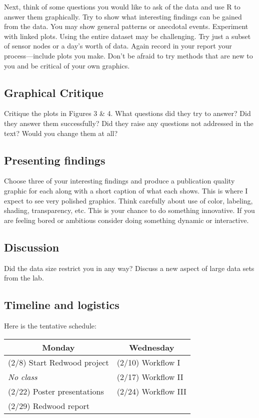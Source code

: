 \documentclass[11pt, oneside]{article}   	%
\begin{document}
Next, think of some questions you would like to ask of the data and use R to
answer them graphically. Try to show what interesting findings can be gained
from the data. You may show general patterns or anecdotal events. Experiment
with linked plots. Using the entire dataset may be challenging. Try just a
subset of sensor nodes or a day's worth of data. Again record in your report
your process---include plots you make. Don't be afraid to try methods that are
new to you and be critical of your own graphics.

\subsection*{Graphical Critique}

Critique the plots in Figures 3 \& 4. What questions did they try to answer?
Did they answer them successfully? Did they raise any questions not addressed
in the text? Would you change them at all?


\subsection*{Presenting findings}

Choose three of your interesting findings and produce a publication quality
graphic for each along with a short caption of what each shows. This is where I
expect to see very polished graphics. Think carefully about use of color,
labeling, shading, transparency, etc. This is your chance to do something
innovative. If you are feeling bored or ambitious consider doing something
dynamic or interactive.


\subsection*{Discussion}

Did the data size restrict you in any way? Discuss a new aspect of large data
sets from the lab.

\subsection*{Timeline and logistics}

Here is the tentative schedule:

\begin{table}[h]
\centering
\begin{tabular}{@{}l|l@{}}
\toprule
\multicolumn{1}{c|}{Monday} & \multicolumn{1}{c}{Wednesday} \\
\hline
(2/8) Start Redwood project   & (2/10) Workflow I \\
\emph{\hspace{12mm} No class} & (2/17) Workflow II \\
(2/22) Poster presentations   & (2/24) Workflow III \\
(2/29) Redwood report         & \\
\bottomrule
\end{tabular}
\end{table}
\end{document}
